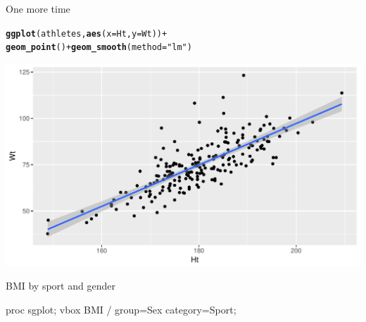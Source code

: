 \documentclass[unknownkeysallowed]{beamer}\usepackage[]{graphicx}\usepackage[]{color}
\makeatletter
\def\maxwidth{ %
  \ifdim\Gin@nat@width>\linewidth
    \linewidth
  \else
    \Gin@nat@width
  \fi
}
\newcommand{\hlstr}[1]{\textcolor[rgb]{0.192,0.494,0.8}{#1}}%
\newcommand{\hlopt}[1]{\textcolor[rgb]{0,0,0}{#1}}%
\newcommand{\hlstd}[1]{\textcolor[rgb]{0.345,0.345,0.345}{#1}}%
\newcommand{\hlkwc}[1]{\textcolor[rgb]{0.333,0.667,0.333}{#1}}%
\newcommand{\hlkwd}[1]{\textcolor[rgb]{0.737,0.353,0.396}{\textbf{#1}}}%
\newenvironment{kframe}{%
 \def\at@end@of@kframe{}%
 \ifinner\ifhmode%
  \def\at@end@of@kframe{\end{minipage}}%
  \begin{minipage}{\columnwidth}%
 \fi\fi%
 \def\FrameCommand##1{\hskip\@totalleftmargin \hskip-\fboxsep
 \colorbox{shadecolor}{##1}\hskip-\fboxsep
     \hskip-\linewidth \hskip-\@totalleftmargin \hskip\columnwidth}%
 \MakeFramed {\advance\hsize-\width
   \@totalleftmargin\z@ \linewidth\hsize
   \@setminipage}}%
 {\par\unskip\endMakeFramed%
 \at@end@of@kframe}
\newenvironment{knitrout}{}{} %
\makeatother
\begin{document}
\begin{frame}[fragile]{One more time}
  
\begin{knitrout}
\color{fgcolor}\begin{kframe}
\begin{alltt}
\hlkwd{ggplot}\hlstd{(athletes,}\hlkwd{aes}\hlstd{(}\hlkwc{x}\hlstd{=Ht,}\hlkwc{y}\hlstd{=Wt))}\hlopt{+}
  \hlkwd{geom_point}\hlstd{()}\hlopt{+}\hlkwd{geom_smooth}\hlstd{(}\hlkwc{method}\hlstd{=}\hlstr{"lm"}\hlstd{)}
\end{alltt}
\end{kframe}
\includegraphics[width=\maxwidth]{figure/unnamed-chunk-32-1} 

\end{knitrout}
  
\end{frame}

\begin{frame}[fragile]{BMI by sport and gender}
  
  \begin{Sascode}[store=gi]
proc sgplot;
  vbox BMI / group=Sex category=Sport;
  \end{Sascode}
  
\end{frame}
\end{document}
